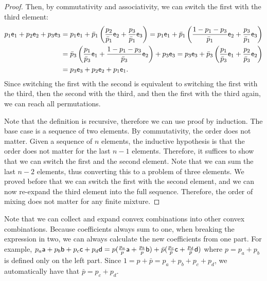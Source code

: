 \begin{mathSection}
\begin{proof}
	Then, by commutativity and associativity, we can switch the first with the third element:
	\begin{equation}
		\begin{aligned}
	 p_1 \ens[e]_1 + p_2 \ens[e]_2 + p_3 \ens_3 &= p_1 \ens_1 + \bar{p}_1\left(\frac{p_2}{\bar{p}_1}\ens_2 + \frac{p_3}{\bar{p}_1}\ens_3\right) = p_1 \ens_1 + \bar{p}_1\left(\frac{1-p_1-p_3}{\bar{p}_1}\ens_2 + \frac{p_3}{\bar{p}_1}\ens_3\right) \\
	 &= \bar{p}_3\left(\frac{p_1}{\bar{p}_3} \ens_1 + \frac{1-p_1-p_3}{\bar{p}_3}\ens_2\right) + p_3 \ens_3 = p_3 \ens_3 + \bar{p}_3\left(\frac{p_1}{\bar{p}_3} \ens_1 + \frac{p_2}{\bar{p}_3}\ens_2\right) \\
	 &= p_3 \ens[e]_3 + p_2 \ens[e]_2 + p_1 \ens_1.
		\end{aligned}
	\end{equation}
	Since switching the first with the second is equivalent to switching the first with the third, then the second with the third, and then the first with the third again, we can reach all permutations.
	
	Note that the definition is recursive, therefore we can use proof by induction. The base case is a sequence of two elements. By commutativity, the order does not matter. Given a sequence of $n$ elements, the inductive hypothesis is that the order does not matter for the last $n-1$ elements. Therefore, it suffices to show that we can switch the first and the second element. Note that we can sum the last $n-2$ elements, thus converting this to a problem of three elements. We proved before that we can switch the first with the second element, and we can now re-expand the third element into the full sequence. Therefore, the order of mixing does not matter for any finite mixture. 
\end{proof}

\begin{remark}
	Note that we can collect and expand convex combinations into other convex combinations. Because coefficients always sum to one, when breaking the expression in two, we can always calculate the new coefficients from one part. For example, $p_a \ens[a] + p_b \ens[b] + p_c \ens[c] + p_d \ens[d] = p(\frac{p_a}{p} \ens[a] + \frac{p_b}{p} \ens[b]) + \bar{p}(\frac{p_c}{\bar{p}} \ens[c] + \frac{p_d}{\bar{p}} \ens[d])$ where $p = p_a + p_b$ is defined only on the left part. Since $1 = p + \bar{p} = p_a +p_b + p_c + p_d$, we automatically have that $\bar{p} = p_c + p_d$.
\end{remark}
\end{mathSection}

